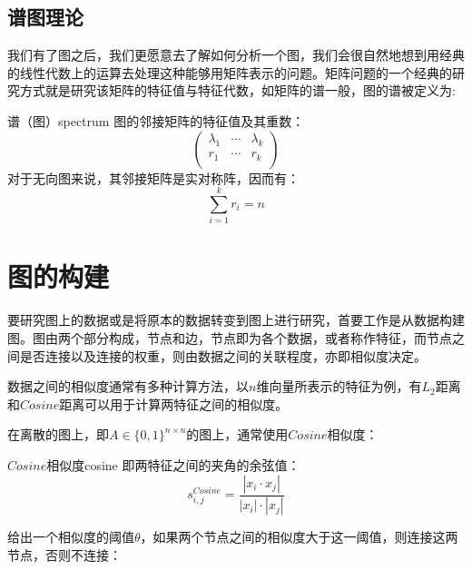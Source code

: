 \documentclass[color=gray,base=hide,cn]{elegantbook}
\begin{document}
\section{谱图理论}

我们有了图之后，我们更愿意去了解如何分析一个图，我们会很自然地想到用经典的线性代数上的运算去处理这种能够用矩阵表示的问题。矩阵问题的一个经典的研究方式就是研究该矩阵的特征值与特征代数，如矩阵的谱一般，图的谱被定义为:
\begin{definition}{谱（图）}{spectrum}
    图的邻接矩阵的特征值及其重数：
    \begin{equation*}
        \begin{pmatrix}
            \lambda_1 & \cdots & \lambda_k \\
            r_1       & \cdots & r_k       \\
        \end{pmatrix}
    \end{equation*}
    对于无向图来说，其邻接矩阵是实对称阵，因而有：
    \begin{equation}
        \sum_{i=1}^k r_i = n
    \end{equation}
\end{definition}

\chapter{图的构建}

要研究图上的数据或是将原本的数据转变到图上进行研究，首要工作是从数据构建图\cite{silva2016machine}。图由两个部分构成，节点和边，节点即为各个数据，或者称作特征，而节点之间是否连接以及连接的权重，则由数据之间的关联程度，亦即相似度决定。

数据之间的相似度通常有多种计算方法，以$n$维向量所表示的特征为例，有$L_2$距离和$Cosine$距离可以用于计算两特征之间的相似度。


在离散的图上，即$A \in \{0,1\}^{n\times n}$的图上，通常使用$Cosine$相似度：

\begin{definition}{$Cosine$相似度}{cosine}
    即两特征之间的夹角的余弦值：
    \begin{equation}
        s^{Cosine}_{i,j} = \frac{\left |x_i \cdot x_j  \right |}{\left | x_i \right | \cdot \left | x_j \right |}
    \end{equation}
\end{definition}

给出一个相似度的阈值$\theta$，如果两个节点之间的相似度大于这一阈值，则连接这两节点，否则不连接：
\end{document}
